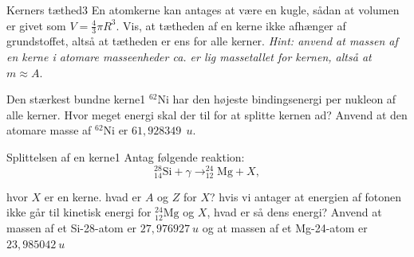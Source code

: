 \begin{opgave}{Kerners tæthed}{3}
\label{opg:density}
En atomkerne kan antages at være en kugle, sådan at volumen er givet som $V=\frac{4}{3} \pi R^3$. Vis, at tætheden af en kerne ikke afhænger af grundstoffet, altså at tætheden er ens for alle kerner. \emph{Hint: anvend at massen af en kerne i atomare masseenheder ca. er lig massetallet for kernen, altså at $m\approx A$}.
\end{opgave}

\begin{opgave}{Den stærkest bundne kerne}{1}
\label{opg:nickel}
$^{62}\text{Ni}$ har den højeste bindingsenergi per nukleon af alle kerner. 
\opg Hvor meget energi skal der til for at splitte kernen ad?
Anvend at den atomare masse af $^{62}\text{Ni}$ er $61,928349~\SI{}{u}$.
\end{opgave}

\begin{opgave}{Splittelsen af en kerne}{1}
Antag følgende reaktion:
\begin{equation*}
^{28}_{14} \text{Si} + \gamma \rightarrow ^{24}_{12}\text{Mg} + X,
\end{equation*}

hvor $X$ er en kerne.
\opg hvad er $A$ og $Z$ for $X$?
\opg hvis vi antager at energien af fotonen ikke går til kinetisk energi for $^{24}_{12}\text{Mg}$ og $X$, hvad er så dens energi? Anvend at massen af et Si-28-atom er $27,976927~\si{u}$ og at massen af et Mg-24-atom er $23,985042~\si{u}$
\end{opgave}

